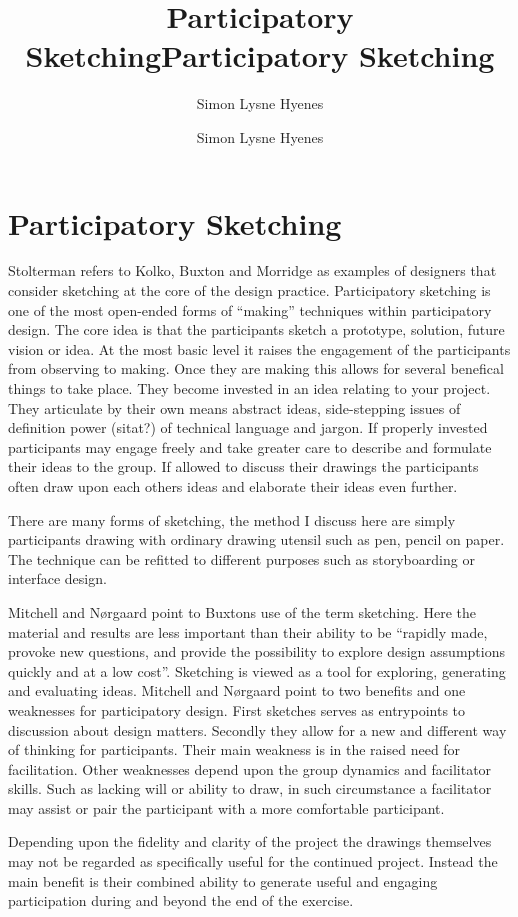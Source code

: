 \documentclass[11pt,UKenglish, a4paper]{article}
\author{Simon Lysne Hyenes}
\title{Participatory Sketching}
\author{Simon Lysne Hyenes}
\title{Participatory Sketching}
\begin{document}
\section{Participatory Sketching}
Stolterman refers to Kolko, Buxton and Morridge \cite[p.61]{Stolterman????Nature} as examples of designers that consider sketching at the core of the design practice. Participatory sketching is one of the most open-ended forms of ``making'' techniques within participatory design. The core idea is that the participants sketch a prototype, solution, future vision or idea. At the most basic level it raises the engagement of the participants from observing to making. Once they are making this allows for several benefical things to take place. They become invested in an idea relating to your project. They articulate by their own means abstract ideas, side-stepping issues of definition power (sitat?) of technical language and jargon. If properly invested participants may engage freely and take greater care to describe and formulate their ideas to the group. If allowed to discuss their drawings the participants often draw upon each others ideas and elaborate their ideas even further.

There are many forms of sketching, the method I discuss here are simply participants drawing with ordinary drawing utensil such as pen, pencil on paper. The technique can be refitted to different purposes such as storyboarding or interface design. 

Mitchell and Nørgaard point to Buxtons use of the term sketching. Here the material and results are less important than their ability to be ``rapidly made, provoke new questions, and provide the possibility to explore design assumptions quickly and at a low cost''\cite[p.2]{Mitchell2011Using}. Sketching is viewed as a tool for exploring, generating and evaluating ideas. Mitchell and Nørgaard point to two benefits and one weaknesses for participatory design. First sketches serves as entrypoints to discussion about design matters. Secondly they allow for a new and different way of thinking for participants. Their main weakness is in the raised need for facilitation. Other weaknesses depend upon the group dynamics and facilitator skills. Such as lacking will or ability to draw, in such circumstance a facilitator may assist or pair the participant with a more comfortable participant.

Depending upon the fidelity and clarity of the project the drawings themselves may not be regarded as specifically useful for the continued project. Instead the main benefit is their combined ability to generate useful and engaging participation during and beyond the end of the exercise.

\printbibliography
\end{document}
